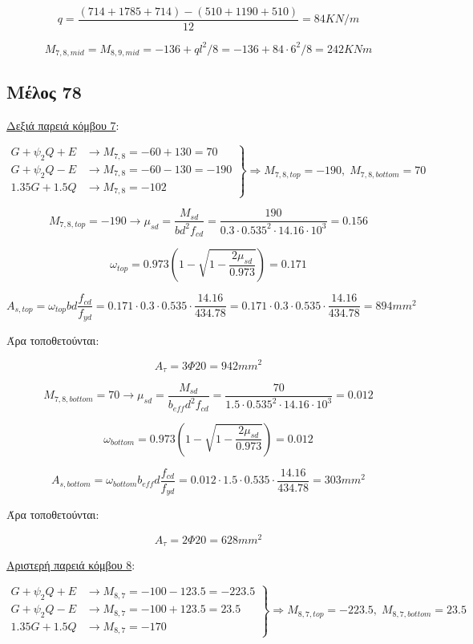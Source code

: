\[
q = \dfrac{\left(714+1785+714\right)-\left(510+1190+510\right)}{12} = 84 KN/m
\]

\[
M_{7,8,mid} = M_{8,9,mid} = - 136 + ql^2/8 = -136 + 84\cdot6^2/8 = 242 KNm
\]

\subsection{Μέλος 78}
\noindent
\underline{Δεξιά παρειά κόμβου 7}:

\[
\left.
   \begin{array}{ll}
     G+\psi_2 Q + Ε & \rightarrow M_{7,8} = -60+130 = 70 \\
     G+\psi_2 Q - Ε & \rightarrow M_{7,8} = -60-130 = -190 \\
     1.35G + 1.5Q     & \rightarrow M_{7,8} = -102
   \end{array}
\right\} \Rightarrow M_{7,8,top} = -190,\; M_{7,8,bottom} = 70
\]

\[
M_{7,8,top} = -190 \rightarrow \mu_{sd} = \dfrac{M_{sd}}{b d^2 f_{cd}} = \dfrac{190}{0.3\cdot0.535^2\cdot14.16\cdot10^3} = 0.156
\]

\[
\omega_{top} = 0.973\left( 1 - \sqrt{1 - \dfrac{2\mu_{sd}}{0.973}} \right) = 0.171
\]

\[
A_{s,top} = \omega_{top}b d \dfrac{f_{cd}}{f_{yd}} = 0.171\cdot 0.3 \cdot 0.535 \cdot \dfrac{14.16}{434.78} = 0.171\cdot 0.3 \cdot 0.535 \cdot \dfrac{14.16}{434.78} = 894mm^2
\]

\noindent
Άρα τοποθετούνται:

\[
A_{\tau} = 3\Phi20 = 942mm^2
\]

\[
M_{7,8,bottom} = 70 \rightarrow \mu_{sd} = \dfrac{M_{sd}}{b_{eff} d^2 f_{cd}} = \dfrac{70}{1.5\cdot0.535^2\cdot14.16\cdot10^3} = 0.012
\]

\[
\omega_{bottom} = 0.973\left( 1 - \sqrt{1 - \dfrac{2\mu_{sd}}{0.973}} \right) = 0.012
\]

\[
A_{s,bottom} = \omega_{bottom}b_{eff} d \dfrac{f_{cd}}{f_{yd}} = 0.012\cdot 1.5 \cdot 0.535 \cdot \dfrac{14.16}{434.78} = 303mm^2
\]

\noindent
Άρα τοποθετούνται:

\[
A_{\tau} = 2\Phi20 = 628mm^2
\]

\noindent
\underline{Αριστερή παρειά κόμβου 8}:

\[
\left.
   \begin{array}{ll}
       G+\psi_2 Q + Ε & \rightarrow M_{8,7} = -100-123.5 = -223.5 \\
       G+\psi_2 Q - Ε & \rightarrow M_{8,7} = -100+123.5 = 23.5 \\
       1.35G + 1.5Q     & \rightarrow M_{8,7} = -170
   \end{array}
\right \} \Rightarrow M_{8,7,top} = -223.5,\; M_{8,7,bottom} = 23.5
\]

